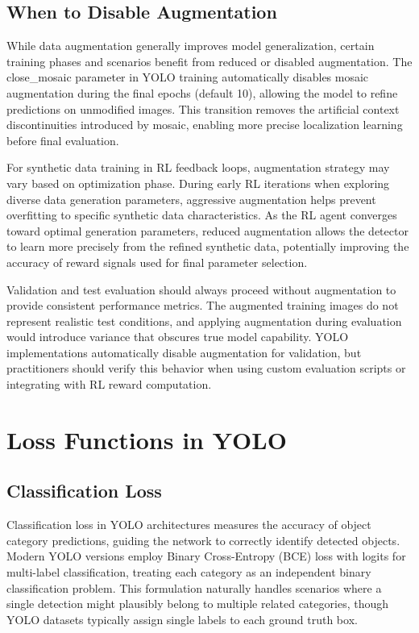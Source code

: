 \subsection{When to Disable Augmentation}

While data augmentation generally improves model generalization, certain training phases and scenarios benefit from reduced or disabled augmentation. The close\_mosaic parameter in YOLO training automatically disables mosaic augmentation during the final epochs (default 10), allowing the model to refine predictions on unmodified images. This transition removes the artificial context discontinuities introduced by mosaic, enabling more precise localization learning before final evaluation.

For synthetic data training in RL feedback loops, augmentation strategy may vary based on optimization phase. During early RL iterations when exploring diverse data generation parameters, aggressive augmentation helps prevent overfitting to specific synthetic data characteristics. As the RL agent converges toward optimal generation parameters, reduced augmentation allows the detector to learn more precisely from the refined synthetic data, potentially improving the accuracy of reward signals used for final parameter selection.

Validation and test evaluation should always proceed without augmentation to provide consistent performance metrics. The augmented training images do not represent realistic test conditions, and applying augmentation during evaluation would introduce variance that obscures true model capability. YOLO implementations automatically disable augmentation for validation, but practitioners should verify this behavior when using custom evaluation scripts or integrating with RL reward computation.

\section{Loss Functions in YOLO}
\label{sec:loss_functions}

\subsection{Classification Loss}

Classification loss in YOLO architectures measures the accuracy of object category predictions, guiding the network to correctly identify detected objects. Modern YOLO versions employ Binary Cross-Entropy (BCE) loss with logits for multi-label classification, treating each category as an independent binary classification problem. This formulation naturally handles scenarios where a single detection might plausibly belong to multiple related categories, though YOLO datasets typically assign single labels to each ground truth box.

